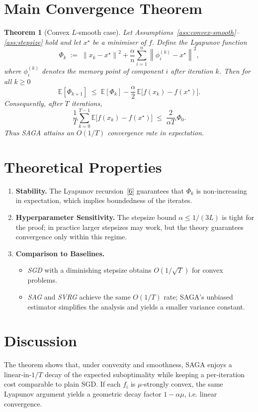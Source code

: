 \documentclass{article}
\newtheorem{theorem}{Theorem}
\newcommand{\E}{\mathbb{E}}
\newcommand{\norm}[1]{\left\lVert #1\right\rVert}
\begin{document}
\section*{Main Convergence Theorem}
\begin{theorem}[Convex $L$‑smooth case]\label{thm:convex}
Let Assumptions~\ref{ass:convex-smooth}–\ref{ass:stepsize} hold and let $x^\star$ be a minimiser of $f$.  
Define the Lyapunov function
\[
\Phi_k \;:=\; \norm{x_k-x^\star}^{2}+ \frac{\alpha}{n}\sum_{i=1}^{n}\norm{\phi_i^{(k)}-x^\star}^{2},
\tag{5}
\]
where $\phi_i^{(k)}$ denotes the memory point of component $i$ after iteration $k$.  
Then for all $k\ge0$
\[
\E[\Phi_{k+1}] \;\le\; \E[\Phi_{k}] -\frac{\alpha}{2}\,\E\!\bigl[f(x_k)-f(x^\star)\bigr].
\tag{6}
\]
Consequently, after $T$ iterations,
\[
\frac{1}{T}\sum_{k=0}^{T-1}\E\!\bigl[f(x_k)-f(x^\star)\bigr]\;\le\;\frac{2}{\alpha T}\,\Phi_{0}.
\tag{7}
\]
Thus SAGA attains an $O(1/T)$ convergence rate in expectation.
\end{theorem}

\section*{Theoretical Properties}
\begin{enumerate}[label=\arabic*.]
\item \textbf{Stability.} The Lyapunov recursion~\eqref{6} guarantees that $\Phi_k$ is non‑increasing in expectation, which implies boundedness of the iterates.
\item \textbf{Hyperparameter Sensitivity.} The stepsize bound $\alpha\le 1/(3L)$ is tight for the proof; in practice larger stepsizes may work, but the theory guarantees convergence only within this regime.
\item \textbf{Comparison to Baselines.}
    \begin{itemize}
        \item \emph{SGD} with a diminishing stepsize obtains $O(1/\sqrt{T})$ for convex problems.
        \item \emph{SAG} and \emph{SVRG} achieve the same $O(1/T)$ rate; SAGA’s unbiased estimator simplifies the analysis and yields a smaller variance constant.
    \end{itemize}
\end{enumerate}

\section*{Discussion}
The theorem shows that, under convexity and smoothness, SAGA enjoys a linear‑in‑$1/T$ decay of the expected suboptimality while keeping a per‑iteration cost comparable to plain SGD. If each $f_i$ is $\mu$‑strongly convex, the same Lyapunov argument yields a geometric decay factor $1-\alpha\mu$, i.e. linear convergence.
\end{document}
